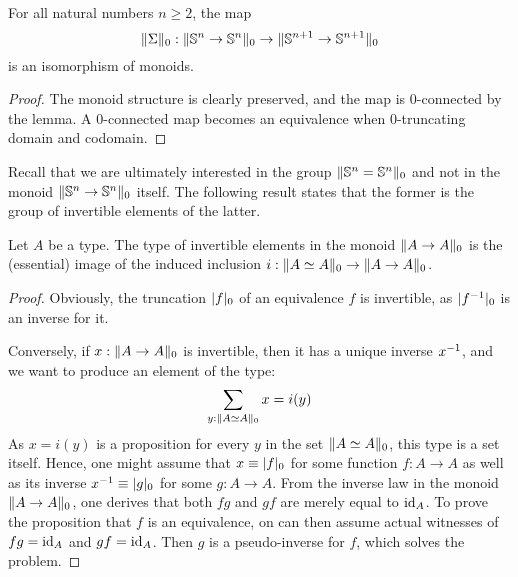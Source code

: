 \documentclass[english,a4]{article}
\newcommand{\setTrunc}[1]{\Trunc{#1}_0}
\newcommand{\settrunc}[1]{\trunc{#1}_0}
\begin{document}
\begin{corollary} \label{cor:higher-spheres-2-comp}
    For all natural numbers $n \geq 2$, the map
    \begin{equation}
    \higherTrunc 0 {\susp} : \higherTrunc 0 {\Sn n \to \Sn n} \to \higherTrunc 0 {\Sn {n+1} \to \Sn {n+1}}
    \end{equation}
    is an isomorphism of monoids.
\end{corollary}
\begin{proof}
    The monoid structure is clearly preserved, and the map is $0$-connected by the lemma. A $0$-connected map becomes an equivalence when $0$-truncating domain and codomain.
\end{proof}

Recall that we are ultimately interested in the group $\setTrunc{\Sn n = \Sn n}$ and not in the monoid $\setTrunc{\Sn n \to \Sn n}$ itself. The following result states that the former is the group of invertible elements of the latter.
\begin{lemma}
    Let $A$ be a type. The type of invertible elements in the monoid $\setTrunc{A \to A}$
    is the (essential) image of the induced inclusion $i:\setTrunc{A \weq A} \to
    \setTrunc{A \to A}$.
    \label{lemma:invertible-truncated-Sn-pointed-weq}
\end{lemma}
\begin{proof}
    Obviously, the truncation $\settrunc{f}$ of an equivalence $f$ is invertible,
    as $\settrunc{\inv f}$ is an inverse for it.
    
    Conversely, if $x:\setTrunc{A \to A}$ is invertible, then 
    it has a unique inverse $\inv x$, and we want to
    produce an element of the type:
    \begin{displaymath}
    \sum_{y:\setTrunc{A \weq A}} x = i(y)
    \end{displaymath}
    As $x=i(y)$ is a proposition for every $y$ in the set $\setTrunc{A
        \weq A}$, this type is a set itself. Hence, one might assume
    that $x \jdeq \settrunc f$ for some function $f:A \to A$ as well
    as its inverse $\inv x \jdeq \settrunc g$ for some $g:A \to A$. 
    From the inverse law in the monoid $\setTrunc{A \to A}$, one
    derives that both $fg$ and $gf$ are merely equal to $\id_{A}$. To prove
    the proposition that $f$ is an equivalence, on can then assume actual
    witnesses of $fg=\id_{A}$ and $gf=\id_{A}$. Then $g$ is a
    pseudo-inverse for $f$, which solves the problem.
\end{proof}
\end{document}
